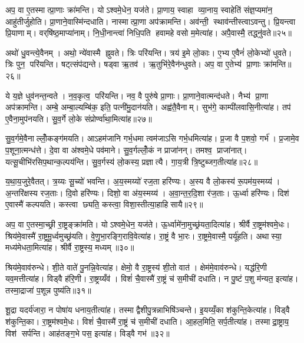 अप॒ वा ए॒तस्मात्प्रा॒णाः क्रा॑मन्ति। योऽश्वमे॒धेन॒ यज॑ते। प्रा॒णाय॒ स्वाहा व्या॒नाय॒ स्वाहेति॑ संज्ञ॒प्यमा॑न॒ आहु॑तीर्जुहोति। प्रा॒णाने॒वास्मि॑न्दधाति। नास्मात्प्रा॒णा अप॑क्रामन्ति। अव॑न्ती॒ स्थाव॑न्तीस्त्वाऽवन्तु। प्रि॒यन्त्वा प्रि॒याणाम्। वर्‌षि॑ष्ठ॒माप्या॑नाम्। नि॒धी॒नान्त्वा॑ निधि॒पति हवामहे वसो म॒मेत्या॑ह। अपै॒वास्मै॒ तद्ध्नु॑वते॥२५॥

अथो॑ धु॒वन्त्ये॒वैनम्। अथो॒ न्ये॑वास्मै ह्नुवते। त्रिः परि॑यन्ति। त्रय॑ इ॒मे लो॒काः। ए॒भ्य ए॒वैनं॑ लो॒केभ्यो॑ धुवते। त्रिः पुन॒ परि॑यन्ति। षट्त्संप॑द्यन्ते। षड्वा ऋ॒तव॑। ऋ॒तुभि॑रे॒वैन॑न्धुवते। अप॒ वा ए॒तेभ्य॑ प्रा॒णाः क्रा॑मन्ति॥२६॥

ये य॒ज्ञे धुव॑नन्त॒न्वते। न॒व॒कृत्व॒ परि॑यन्ति। नव॒ वै पुरु॑षे प्रा॒णाः। प्रा॒णाने॒वात्मन्द॑धते। नैभ्य॑ प्रा॒णा अप॑क्रामन्ति। अम्बे॒ अम्बा॒ल्यम्बि॑क॒ इति॒ पत्नी॑मु॒दान॑यति। अह्व॑तै॒वैनाम्। सुभ॑गे॒ काम्पी॑लवासि॒नीत्या॑ह। तप॑ ए॒वैना॒मुप॑नयति। सु॒व॒र्गे लो॒के संप्रोर्ण्वा॑था॒मित्या॑ह॥२७॥

सु॒व॒र्गमे॒वैनाल्लोँ॒कङ्ग॑मयति। आऽहम॑जानि गर्भ॒धमा त्वम॑जाऽसि गर्भ॒धमित्या॑ह। प्र॒जा वै प॒शवो॒ गर्भ॑। प्र॒जामे॒व प॒शूना॒त्मन्ध॑त्ते। दे॒वा वा अ॑श्वमे॒धे पव॑माने। सु॒व॒र्गल्लोँ॒कं न प्राजा॑नन्। तमश्व॒ प्राजा॑नात्। यत्सू॒चीभि॑रसिप॒थान्क॒ल्पय॑न्ति। सु॒व॒र्गस्य॑ लो॒कस्य॒ प्रज्ञात्यै। गा॒य॒त्री त्रि॒ष्टुब्जग॒तीत्या॑ह॥२८॥

य॒था॒य॒जुरे॒वैतत्। त्र॒य्यः सू॒च्यो॑ भवन्ति। अ॒य॒स्मय्यो॑ रज॒ता हरि॑ण्यः। अ॒स्य वै लो॒कस्य॑ रू॒पम॑य॒स्मय्य॑। अ॒न्तरि॑क्षस्य रज॒ताः। दि॒वो हरि॑ण्यः। दिशो॒ वा अ॑य॒स्मय्य॑। अ॒वा॒न्त॒र॒दि॒शा र॑ज॒ताः। ऊ॒र्ध्वा हरि॑ण्यः। दिश॑ ए॒वास्मै॑ कल्पयति। कस्त्वा छ्यति॒ कस्त्वा॒ विशा॒स्तीत्या॒हाहिसायै॥२९॥\anuvakamend[ह्नु॒व॒ते॒ क्रा॒म॒न्त्यू॒र्ण्वा॒था॒मित्या॑ह॒ जग॒तीत्या॑ह कल्पय॒त्येकं च]

अप॒ वा ए॒तस्मा॒च्छ्री रा॒ष्ट्रङ्क्रा॑मति। योऽश्वमे॒धेन॒ यज॑ते। ऊ॒र्ध्वामे॑ना॒मुच्छ्र॑यता॒दित्या॑ह। श्रीर्वै रा॒ष्ट्रम॑श्वमे॒धः। श्रिय॑मे॒वास्मै॑ रा॒ष्ट्रमू॒र्ध्वमुच्छ्र॑यति। वे॒णु॒भा॒रङ्गि॒रावि॒वेत्या॑ह। रा॒ष्ट्रं वै भा॒रः। रा॒ष्ट्रमे॒वास्मै॒ पर्यू॑हति। अथास्या॒ मध्य॑मेधता॒मित्या॑ह। श्रीर्वै रा॒ष्ट्रस्य॒ मध्यम्॥३०॥

श्रिय॑मे॒वाव॑रुन्धे। शी॒ते वाते॑ पु॒नन्नि॒वेत्या॑ह। क्षेमो॒ वै रा॒ष्ट्रस्य॑ शी॒तो वात॑। क्षेम॑मे॒वाव॑रुन्धे। यद्ध॑रि॒णी यव॒मत्तीत्या॑ह। विड्वै ह॑रि॒णी। रा॒ष्ट्रय्यँव॑। विशं॑ चै॒वास्मै॑ रा॒ष्ट्रं च॑ स॒मीची॑ दधाति। न पु॒ष्टं प॒शु म॑न्यत॒ इत्या॑ह। तस्मा॒द्राजा॑ प॒शून्न पुष्य॑ति॥३१॥

शू॒द्रा यदर्य॑जारा॒ न पोषा॑य धनाय॒तीत्या॑ह। तस्माद्वैशीपु॒त्रन्नाभिषि॑ञ्चन्ते। इ॒यय्यँ॒का श॑कुन्ति॒केत्या॑ह। विड्वै श॑कुन्ति॒का। रा॒ष्ट्रम॑श्वमे॒धः। विशं॑ चै॒वास्मै॑ रा॒ष्ट्रं च॑ स॒मीची॑ दधाति। आ॒हल॒मिति॒ सर्प॒तीत्या॑ह। तस्माद्रा॒ष्ट्राय॒ विश॑ सर्पन्ति। आह॑तङ्ग॒भे पस॒ इत्या॑ह। विड्वै गभ॑॥३२॥

